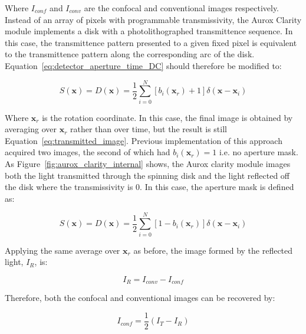 Where $I_{conf}$ and $I_{conv}$ are the confocal and conventional images respectively. Instead of an array of pixels with programmable transmissivity, the Aurox Clarity module implements a disk with a photolithographed transmittence sequence. In this case, the transmittence pattern presented to a given fixed pixel is equivalent to the transmittence pattern along the corresponding arc of the disk.\cite{wilson1996confocal} Equation~\ref{eq:detector_aperture_time_DC} should therefore be modified to:

\begin{equation}\label{eq:detector_aperture_arc}
S\left(\textbf{x}\right) = D\left(\textbf{x}\right) = \frac{1}{2} \sum_{i=0}^{N} \left[b_{i}\left(\textbf{x}_{r}\right) + 1\right]\delta\left(\textbf{x} - \textbf{x}_{i}\right)
\end{equation}

Where $\textbf{x}_{r}$ is the rotation coordinate. In this case, the final image is obtained by averaging over $\textbf{x}_{r}$ rather than over time, but the result is still Equation~\ref{eq:transmitted_image}. Previous implementation of this approach acquired two images, the second of which had $b_{i}\left(\textbf{x}_{r}\right) = 1$ i.e. no aperture mask. As Figure~\ref{fig:aurox_clarity_internal} shows, the Aurox clarity module images both the light transmitted through the spinning disk and the light reflected off the disk where the transmissivity is $0$. In this case, the aperture mask is defined as:

\begin{equation}\label{eq:detector_aperture_arc_reflect}
	S\left(\textbf{x}\right) = D\left(\textbf{x}\right) = \frac{1}{2} \sum_{i=0}^{N} \left[1 - b_{i}\left(\textbf{x}_{r}\right)\right]\delta\left(\textbf{x} - \textbf{x}_{i}\right)
\end{equation}

Applying the same average over $\textbf{x}_{r}$ as before, the image formed by the reflected light, $I_{R}$, is:

\begin{equation}\label{eq:reflected_image}
	I_{R} = I_{conv} - I_{conf}
\end{equation}

Therefore, both the confocal and conventional images can be recovered by:

\begin{equation}\label{eq:confocal_image}
	I_{conf} = \frac{1}{2}\left(I_{T} - I_{R}\right)
\end{equation}

